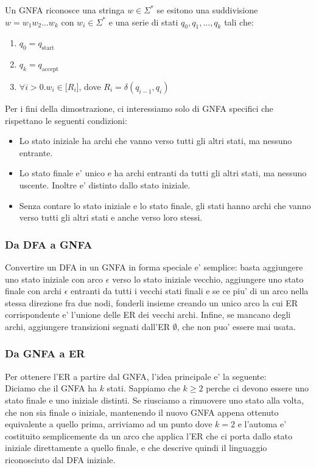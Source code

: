 Un GNFA riconosce una stringa $ w \in \Sigma^* $ se esitono una suddivisione $ w = w_1w_2...w_k $ con $ w_i \in \Sigma^* $ e una serie di stati $ q_0,q_1,...,q_k $ tali che:
\begin{enumerate}
  \item $ q_0 = q_{\text{start}} $
  \item $ q_k = q_{\text{accept}} $
  \item $ \forall i > 0. w_i \in \mathcal[R_i] $, dove $ R_i = \delta(q_{i-1}, q_i) $
\end{enumerate}


Per i fini della dimostrazione, ci interessiamo solo di GNFA specifici che rispettano le seguenti condizioni:
\begin{itemize}
  \item Lo stato iniziale ha archi che vanno verso tutti gli altri stati, ma nessuno entrante.
  \item Lo stato finale e' unico e ha archi entranti da tutti gli altri stati, ma nessuno uscente. Inoltre e' distinto dallo stato iniziale.
  \item Senza contare lo stato iniziale e lo stato finale, gli stati hanno archi che vanno verso tutti gli altri stati e anche verso loro stessi.
\end{itemize}

\subsubsection{Da DFA a GNFA}
Convertire un DFA in un GNFA in forma speciale e' semplice: basta aggiungere uno stato iniziale con arco $ \epsilon $ verso lo stato iniziale vecchio, aggiungere uno stato finale con archi $ \epsilon $ entranti da tutti i vecchi stati finali e se ce piu' di un arco nella stessa direzione fra due nodi, fonderli insieme creando un unico arco la cui ER corrispondente e' l'unione delle ER dei vecchi archi. Infine, se mancano degli archi, aggiungere transizioni segnati dall'ER $ \emptyset $, che non puo' essere mai usata. 

\subsubsection{Da GNFA a ER}
Per ottenere l'ER a partire dal GNFA, l'idea principale e' la seguente:\\
Diciamo che il GNFA ha $ k $ stati. Sappiamo che $ k \geq 2 $ perche ci devono essere uno stato finale e uno iniziale distinti. Se riusciamo a rimuovere uno stato alla volta, che non sia finale o iniziale, mantenendo il nuovo GNFA appena ottenuto equivalente a quello prima, arriviamo ad un punto dove $ k=2 $ e l'automa e' costituito semplicemente da un arco che applica l'ER che ci porta dallo stato iniziale direttamente a quello finale, e che descrive quindi il linguaggio riconosciuto dal DFA iniziale.

